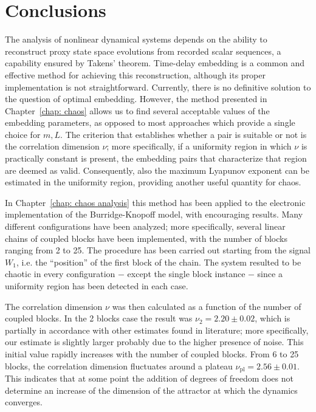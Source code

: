 \chapter*{Conclusions}

The analysis of nonlinear dynamical systems depends on the ability to reconstruct proxy state space evolutions from recorded scalar sequences, a capability ensured by Takens' theorem. Time-delay embedding is a common and effective method for achieving this reconstruction, although its proper implementation is not straightforward. Currently, there is no definitive solution to the question of optimal embedding.
However, the method presented in Chapter~\ref{chap: chaos} allows us to find several acceptable
values of the embedding parameters, as opposed to most approaches which provide a single choice for
$m,L$. The criterion that establishes whether a pair is suitable or not is the correlation dimension
$\nu$; more specifically, if a uniformity region in which $\nu$ is practically constant is present,
the embedding pairs that characterize that region are deemed as valid. Consequently, also the maximum
Lyapunov exponent can be estimated in the uniformity region, providing another useful quantity for chaos.

In Chapter~\ref{chap: chaos analysis} this method has been applied to the electronic implementation of
the Burridge-Knopoff model, with encouraging results. Many different configurations have been analyzed;
more specifically, several linear chains of coupled blocks have been implemented, with the number of
blocks ranging from 2 to 25. The procedure has been carried out starting from the signal $W_1$, i.e.
the ``position'' of the first block of the chain. The system resulted to be chaotic in every
configuration $-$ except the single block instance $-$ since a uniformity region has been detected in
each case.

The correlation dimension $\nu$ was then calculated as a function of the number of coupled
blocks. In the 2 blocks case the result was $\nu_2=2.20\pm0.02$, which is partially in accordance with
other estimates found in literature; more specifically, our estimate is slightly larger probably due
to the higher presence of noise. This initial value rapidly increases with the
number of coupled blocks. From 6 to 25 blocks, the correlation dimension fluctuates around a plateau
$\nu_{\text{pl}}=2.56\pm0.01$.
This indicates that at some point the addition of degrees of freedom does not determine an increase
of the dimension of the attractor at which the dynamics converges.

